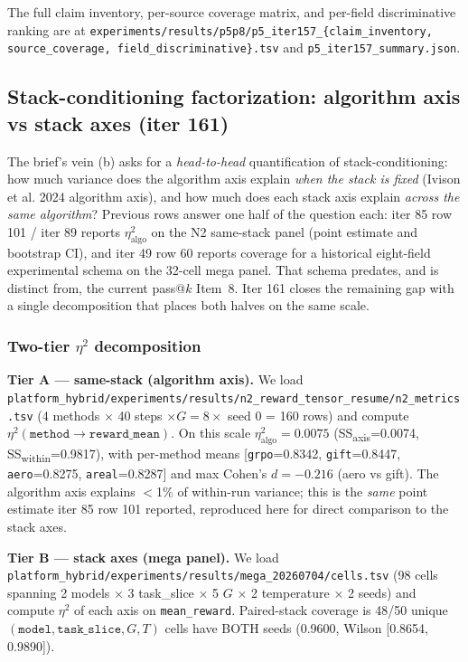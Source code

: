 \documentclass{article}  \usepackage[preprint,nonatbib]{neurips_2026} \usepackage[numbers]{natbib}
\begin{document}
The full claim inventory, per-source coverage matrix, and per-field
discriminative ranking are at
\texttt{experiments/results/p5p8/p5\_iter157\_\{claim\_inventory,
source\_coverage, field\_discriminative\}.tsv} and
\texttt{p5\_iter157\_summary.json}. \subsection{Stack-conditioning factorization: algorithm axis vs stack axes (iter 161)}
\label{sec:p5-iter161-stack-factorization}

The brief's vein (b) asks for a \emph{head-to-head} quantification of
stack-conditioning: how much variance does the algorithm axis explain
\emph{when the stack is fixed} (Ivison et al. 2024 algorithm axis), and
how much does each stack axis explain \emph{across the same algorithm}?
Previous rows answer one half of the question each: iter 85 row 101 /
iter 89 reports $\eta^2_{\mathrm{algo}}$ on the N2 same-stack panel
(point estimate and bootstrap CI), and iter 49 row 60 reports coverage for a
historical eight-field experimental schema on the 32-cell mega panel. That
schema predates, and is distinct from, the current pass@$k$ Item~8. Iter 161 closes the
remaining gap with a single decomposition that places both halves on
the same scale.

\subsubsection{Two-tier $\eta^2$ decomposition}
\label{sec:p5-iter161-two-tier}
\textbf{Tier A --- same-stack (algorithm axis).} We load
\texttt{platform_hybrid/experiments/results/n2\_reward\_tensor\_resume/n2\_metrics.tsv}
(4 methods $\times$ 40 steps $\times G{=}8 \times$ seed 0 = 160 rows)
and compute $\eta^2(\texttt{method} \to \texttt{reward\_mean})$. On
this scale \textbf{$\eta^2_{\mathrm{algo}} = 0.0075$} (SS\textsubscript{axis}=0.0074,
SS\textsubscript{within}=0.9817), with per-method means
[\texttt{grpo}=0.8342, \texttt{gift}=0.8447, \texttt{aero}=0.8275,
\texttt{areal}=0.8287] and max Cohen's $d{=}{-}0.216$ (aero vs gift).
The algorithm axis explains $<$1\% of within-run variance; this is the
\emph{same} point estimate iter 85 row 101 reported, reproduced here
for direct comparison to the stack axes.

\textbf{Tier B --- stack axes (mega panel).} We load
\texttt{platform_hybrid/experiments/results/mega\_20260704/cells.tsv} (98 cells
spanning 2 models $\times$ 3 task\_slice $\times$ 5 $G$ $\times$ 2
temperature $\times$ 2 seeds) and compute $\eta^2$ of each axis on
\texttt{mean\_reward}. Paired-stack coverage is 48/50 unique
$(\texttt{model},\texttt{task\_slice},G,T)$ cells have BOTH seeds
(0.9600, Wilson [0.8654, 0.9890]).
\end{document}
